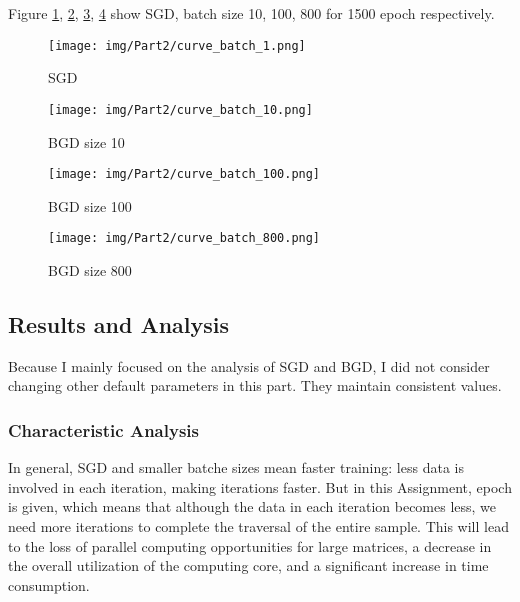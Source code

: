   Figure \ref{fig:p2batch1}, \ref{fig:p2batch10}, \ref{fig:p2batch100}, \ref{fig:p2batch800} show SGD, batch size 10, 100, 800 for 1500 epoch respectively.

  \begin{figure}[!htbp]
    \centering
    \texttt{[image: img/Part2/curve\_batch\_1.png]}
    \caption{SGD}
    \label{fig:p2batch1}
  \end{figure}

  \begin{figure}[!htbp]
    \centering
    \texttt{[image: img/Part2/curve\_batch\_10.png]}
    \caption{BGD size 10}
    \label{fig:p2batch10}
  \end{figure}

  \begin{figure}[!htbp]
    \centering
    \texttt{[image: img/Part2/curve\_batch\_100.png]}
    \caption{BGD size 100}
    \label{fig:p2batch100}
  \end{figure}

  \begin{figure}[!htbp]
    \centering
    \texttt{[image: img/Part2/curve\_batch\_800.png]}
    \caption{BGD size 800}
    \label{fig:p2batch800}
  \end{figure}

  \subsection{Results and Analysis}

  Because I mainly focused on the analysis of SGD and BGD, I did not consider changing other default parameters in this part.
  They maintain consistent values.

  \subsubsection{Characteristic Analysis}

  In general, SGD and smaller batche sizes mean faster training: less data is involved in each iteration, making iterations faster.
  But in this Assignment, epoch is given, which means that although the data in each iteration becomes less, we need more iterations to complete the traversal of the entire sample.
  This will lead to the loss of parallel computing opportunities for large matrices, a decrease in the overall utilization of the computing core, and a significant increase in time consumption.


